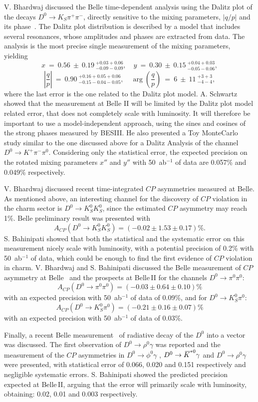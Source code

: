 \documentclass{PoS}
\def\Kbar{{\kern 0.2em\overline{\kern -0.2em \ensuremath{K}}{}}\xspace}
\newcommand{\CP}{{\ensuremath{C\!P}}\xspace}
\begin{document}
V. Bhardwaj discussed the Belle time-dependent
analysis using the Dalitz plot of the decays $D^0\to K_S \pi^+ \pi^-$,
directly sensitive to the mixing parameters, $|q/p|$ and its phase~\cite{PhysRevD.89.091103}.
The Dalitz plot distribution is described by a model that includes
several resonances, whose amplitudes and phases are extracted from data.
The analysis is the most precise single measurement of the mixing
parameters, yielding 
$$x~=~0.56~\pm~0.19~^{+0.03+0.06}_{-0.09 - 0.09}, \quad
y~=~0.30~\pm~0.15~^{+0.04+0.03}_{-0.05 - 0.06},$$
$$\left|\frac{q}{p}\right|~=~0.90~^{+0.16+0.05+0.06}_{-0.15-0.04 - 0.05}, \quad
\arg\left(\frac{q}{p}\right)~=~6~\pm~11~^{+3+3}_{-4 -4},$$
where the last error is the one related to the Dalitz plot model.
A. Schwartz showed that the measurement at Belle II will be limited
by the Dalitz plot model related error, that
does not completely scale with luminosity. It will therefore be
important to use a model-independent approach, using the sines and
cosines of the strong phases measured by BESIII.
He also presented a Toy MonteCarlo study similar to the one
discussed above for a Dalitz Analysis of the channel $D^0\to K^+ \pi^-
\pi^0$. Considering only the statistical error, the expected
precision on the rotated mixing parameters $x''$ and $y''$ with 50~ab$^{-1}$ of data are 0.057\% and 0.049\% respectively.

V. Bhardwaj discussed recent time-integrated \CP asymmetries
measured at Belle. As mentioned above, an interesting channel for the discovery of \CP violation in the charm sector is
$D^0\to K^0_S K^0_S$, since the estimated \CP asymmetry may reach 1\%.
Belle preliminary result was presented with 
$$A_{\CP}(D^0\to K^0_S K^0_S) = (-0.02\pm 1.53 \pm 0.17)\%.$$ 
S. Bahinipati showed that both the
statistical and the systematic error on this measurement nicely scale
with luminosity, with a potential precision of 0.2\% with 50~ab$^{-1}$ of data,
which could be enough to find the first evidence of \CP violation in charm.
V. Bhardwaj  and S. Bahinipati discussed the Belle measurement of
\CP asymmetry at Belle~\cite{PhysRevLett.112.211601} and the prospects at Belle\,II for the channels
$D^0 \to \pi^0 \pi^0$: 
$$A_{\CP}(D^0\to\pi^0\pi^0) = (-0.03\pm0.64\pm0.10)\%$$
with an expected precision with 50~ab$^{-1}$ of data of 0.09\%, and for  $D^0 \to K^0_S \pi^0$: 
$$A_{\CP}(D^0 \to K^0_S \pi^0) = (-0.21\pm0.16\pm0.07)\%$$
with an expected precision with 50~ab$^{-1}$ of data of 0.03\%.

Finally, a recent Belle measurement~\cite{PhysRevLett.118.051801} of radiative decay of the $D^0$ into
a vector was discussed. The first observation of $D^0\to \rho^0
\gamma$ was reported and the measurement of the \CP asymmetries in 
$D^0\to \phi^0 \gamma$ , $D^0\to \Kbar^{*0} \gamma$ and $D^0\to \rho^0 \gamma$ 
were presented, with statistical error of 0.066, 0.020 and 0.151
respectively and negligible systematic errors. S. Bahinipati showed
the predicted precision expected at Belle\,II, arguing that the error
will primarily scale with luminosity, obtaining:  0.02, 0.01 and
0.003 respectively.
\end{document}
